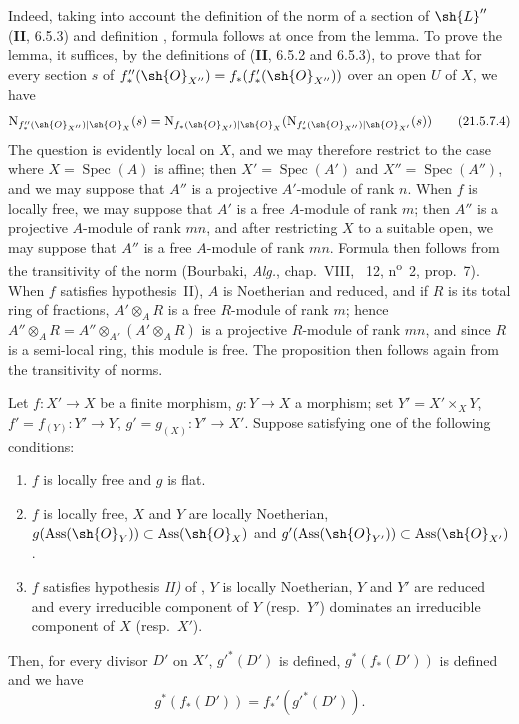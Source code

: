 Indeed, taking into account the definition of the norm of a section of $\sh{L}''$ (\textbf{II}, 6.5.3) and definition , formula  follows at once from the lemma.
To prove the lemma, it suffices, by the definitions of (\textbf{II}, 6.5.2 and 6.5.3), to prove that for every section $s$ of $f_*''(\sh{O}_{X''})=f_*(f_*'(\sh{O}_{X''}))$ over an open $U$ of $X$, we have
\[
\label{IV.21.5.7.4}
  \mathrm{N}_{f_*''(\sh{O}_{X''})|\sh{O}_X}(s)=\mathrm{N}_{f_*(\sh{O}_{X'})|\sh{O}_X}(\mathrm{N}_{f_*'(\sh{O}_{X''})|\sh{O}_{X'}}(s))
  \tag{21.5.7.4}
\]
The question is evidently local on $X$, and we may therefore restrict to the case where $X=\operatorname{Spec}(A)$ is affine;
then $X'=\operatorname{Spec}(A')$ and $X''=\operatorname{Spec}(A'')$, and we may suppose that $A''$ is a projective $A'$-module of rank $n$.
When $f$ is locally free, we may suppose that $A'$ is a free $A$-module of rank $m$;
then $A''$ is a projective $A$-module of rank $mn$, and after restricting $X$ to a suitable open, we may suppose that $A''$ is a free $A$-module of rank $mn$.
Formula  then follows from the transitivity of the norm (Bourbaki, \emph{Alg.}, chap.~VIII, \textsection~12, n\textsuperscript{o}~2, prop.~7).
When $f$ satisfies hypothesis~II), $A$ is Noetherian and reduced, and if $R$ is its total ring of fractions, $A'\otimes_A R$ is a free $R$-module of rank $m$;
hence $A''\otimes_A R=A''\otimes_{A'}(A'\otimes_A R)$ is a projective $R$-module of rank $mn$, and since $R$ is a semi-local ring, this module is free.
The proposition then follows again from the transitivity of norms.

\begin{proposition}[21.5.8]
\label{IV.21.5.8}
Let $f:X'\to X$ be a finite morphism, $g:Y\to X$ a morphism;
set $Y'=X'\times_XY$, $f'=f_{(Y)}:Y'\to Y$, $g'=g_{(X)}:Y'\to X'$.
Suppose satisfying one of the following conditions:
\begin{enumerate}[label=(\roman*)]
  \item $f$ is locally free and $g$ is flat.
  \item $f$ is locally free, $X$ and $Y$ are locally Noetherian, $g(\operatorname{Ass}(\sh{O}_Y))\subset\operatorname{Ass}(\sh{O}_X)$ and $g'(\operatorname{Ass}(\sh{O}_{Y'}))\subset\operatorname{Ass}(\sh{O}_{X'})$.
  \item $f$ satisfies hypothesis \emph{II)} of , $Y$ is locally Noetherian, $Y$ and $Y'$ are reduced and every irreducible component of $Y$ (resp.\ $Y'$) dominates an irreducible component of $X$ (resp.\ $X'$).
\end{enumerate}
Then, for every divisor $D'$ on $X'$, $g'^*(D')$ is defined, $g^*(f_*(D'))$ is defined and we have
\[
\label{IV.21.5.8.1}
  g^*(f_*(D'))=f_*'(g'^*(D')).
  \tag{21.5.8.1}
\]
\end{proposition}

